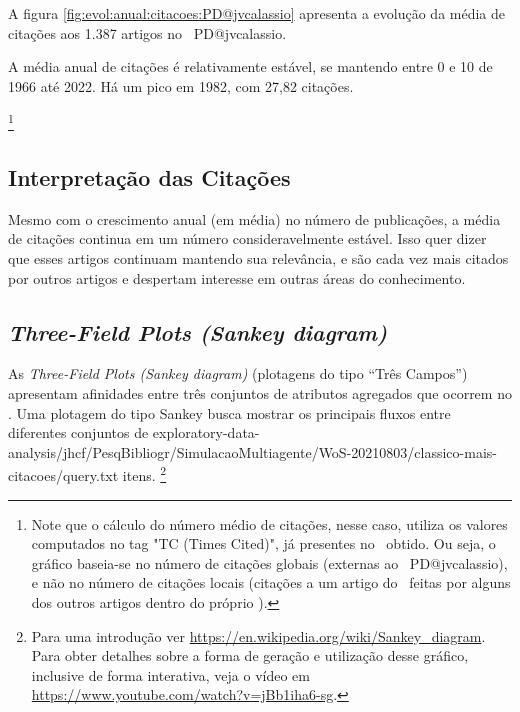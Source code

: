 A figura \ref{fig:evol:anual:citacoes:PD@jvcalassio} apresenta a evolução da média de citações aos 1.387 artigos no \dataset\   PD@jvcalassio.

A média anual de citações é relativamente estável, se mantendo entre 0 e 10 de 1966 até 2022. Há um pico em 1982, com 27,82 citações.

\footnote{Note que o cálculo do número  médio de citações, nesse caso, utiliza os valores computados no tag "TC (Times Cited)", já presentes no \dataset\   obtido. Ou seja, o gráfico baseia-se no número de citações globais (externas ao \dataset\   PD@jvcalassio), e não no número de citações locais (citações a um artigo do \dataset\   feitas por alguns dos outros artigos dentro do próprio \dataset).}

\subsection{Interpretação das Citações}
Mesmo com o crescimento anual (em média) no número de publicações, a média de citações continua em um número consideravelmente estável. Isso quer dizer que esses artigos continuam mantendo sua relevância, e são cada vez mais citados por outros artigos e despertam interesse em outras áreas do conhecimento.

\subsection{\textit{Three-Field Plots (Sankey diagram)} \label{PD@jvcalassio:Sankey}}

As \textit{Three-Field Plots (Sankey diagram)} (plotagens do tipo ``Três Campos'') apresentam afinidades entre três conjuntos de atributos agregados que ocorrem no \dataset. Uma plotagem do tipo Sankey busca mostrar os principais fluxos entre diferentes conjuntos de
{exploratory-data-analysis/jhcf/PesqBibliogr/SimulacaoMultiagente/WoS-20210803/classico-mais-citacoes/query.txt} itens. \footnote{Para uma introdução ver \url{https://en.wikipedia.org/wiki/Sankey_diagram}. Para obter detalhes sobre a forma de geração e utilização desse gráfico, inclusive de forma interativa, veja o vídeo em \url{https://www.youtube.com/watch?v=jBb1iha6-sg}.} 

